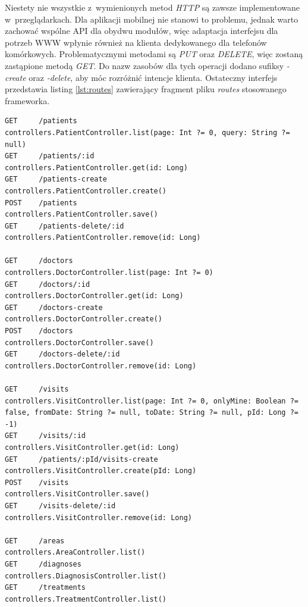 \documentclass[11pt]{aghdpl}
\begin{document}
Niestety nie wszystkie z~wymienionych metod \emph{HTTP} są zawsze implementowane w~przeglądarkach. Dla aplikacji mobilnej nie stanowi to problemu, jednak warto zachować wspólne API dla obydwu modułów, więc adaptacja interfejsu dla potrzeb WWW wpłynie również na klienta dedykowanego dla telefonów komórkowych. Problematycznymi metodami są \emph{PUT} oraz \emph{DELETE}, więc zostaną zastąpione metodą \emph{GET}. Do nazw zasobów dla tych operacji dodano sufiksy \emph{-create} oraz \emph{-delete}, aby móc rozróżnić intencje klienta.
Ostateczny interfejs przedstawia listing \ref{lst:routes} zawierający fragment pliku \emph{routes} stosowanego frameworka.

\begin{lstlisting}[caption={Fragment pliku \emph{routes} zawierającego mapowanie wzorców URL interfejsu RESTful do wywoływanych metod kontrolerów w \emph{Play Framework}}, label={lst:routes}]
GET     /patients                                               controllers.PatientController.list(page: Int ?= 0, query: String ?= null)
GET     /patients/:id                                           controllers.PatientController.get(id: Long)
GET     /patients-create                                        controllers.PatientController.create()
POST    /patients                                                 controllers.PatientController.save()
GET     /patients-delete/:id                                     controllers.PatientController.remove(id: Long)

GET     /doctors                                                 controllers.DoctorController.list(page: Int ?= 0)
GET     /doctors/:id                                             controllers.DoctorController.get(id: Long)
GET     /doctors-create                                          controllers.DoctorController.create()
POST    /doctors                                                   controllers.DoctorController.save()
GET     /doctors-delete/:id                                      controllers.DoctorController.remove(id: Long)

GET     /visits                                                  controllers.VisitController.list(page: Int ?= 0, onlyMine: Boolean ?= false, fromDate: String ?= null, toDate: String ?= null, pId: Long ?= -1)
GET     /visits/:id                                              controllers.VisitController.get(id: Long)
GET     /patients/:pId/visits-create                             controllers.VisitController.create(pId: Long)
POST    /visits                                                  controllers.VisitController.save()
GET     /visits-delete/:id                                       controllers.VisitController.remove(id: Long)

GET     /areas                                                   controllers.AreaController.list()
GET     /diagnoses                                               controllers.DiagnosisController.list()
GET     /treatments                                              controllers.TreatmentController.list()
\end{lstlisting}
\end{document}
